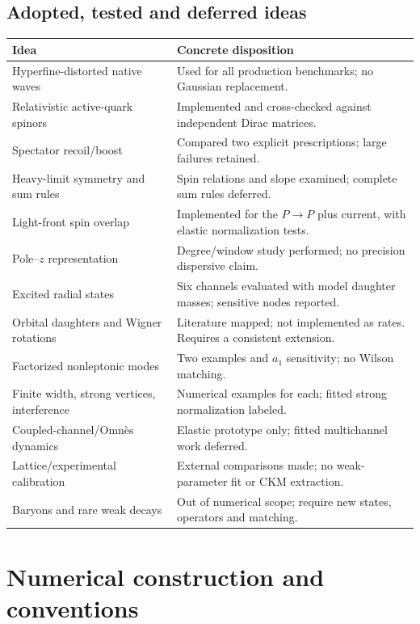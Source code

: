 \documentclass[11pt,a4paper]{article}
\begin{document}
\subsection{Adopted, tested and deferred ideas}
\begin{longtable}{>{\raggedright\arraybackslash}p{.30\linewidth}>{\raggedright\arraybackslash}p{.62\linewidth}}
\toprule Idea & Concrete disposition \\\midrule
Hyperfine-distorted native waves & Used for all production benchmarks; no Gaussian replacement.\\
Relativistic active-quark spinors & Implemented and cross-checked against independent Dirac matrices.\\
Spectator recoil/boost & Compared two explicit prescriptions; large failures retained.\\
Heavy-limit symmetry and sum rules & Spin relations and slope examined; complete sum rules deferred.\\
Light-front spin overlap & Implemented for the $P\to P$ plus current, with elastic normalization tests.\\
Pole--$z$ representation & Degree/window study performed; no precision dispersive claim.\\
Excited radial states & Six channels evaluated with model daughter masses; sensitive nodes reported.\\
Orbital daughters and Wigner rotations & Literature mapped; not implemented as rates. Requires a consistent extension.\\
Factorized nonleptonic modes & Two examples and $a_1$ sensitivity; no Wilson matching.\\
Finite width, strong vertices, interference & Numerical examples for each; fitted strong normalization labeled.\\
Coupled-channel/Omn\`es dynamics & Elastic prototype only; fitted multichannel work deferred.\\
Lattice/experimental calibration & External comparisons made; no weak-parameter fit or CKM extraction.\\
Baryons and rare weak decays & Out of numerical scope; require new states, operators and matching.\\
\bottomrule
\end{longtable}

\section{Numerical construction and conventions}
\end{document}
